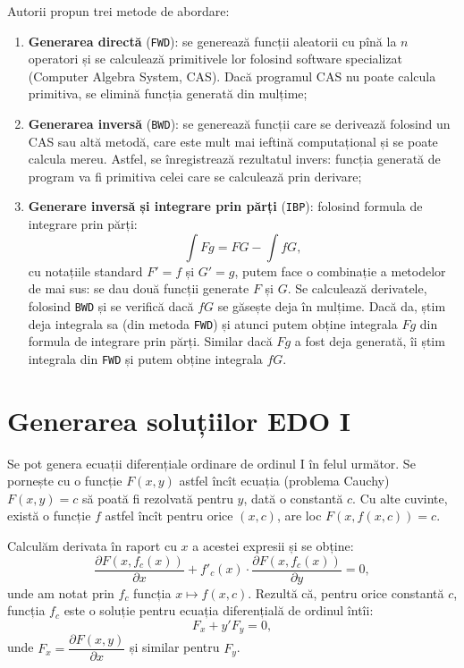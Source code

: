 Autorii propun trei metode de abordare:
\begin{enumerate}[(1)]
    \item \textbf{Generarea directă} (\texttt{FWD}): se generează funcții
        aleatorii cu pînă la $ n $ operatori și se calculează primitivele
        lor folosind software specializat (Computer Algebra System, CAS).
        Dacă programul CAS nu poate calcula primitiva, se elimină funcția
        generată din mulțime;
    \item \textbf{Generarea inversă} (\texttt{BWD}): se generează
        funcții care se derivează folosind un CAS sau altă metodă, care
        este mult mai ieftină computațional și se poate calcula mereu.
        Astfel, se înregistrează rezultatul invers: funcția generată
        de program va fi primitiva celei care se calculează prin derivare;
    \item \textbf{Generare inversă și integrare prin părți} (\texttt{IBP}):
        folosind formula de integrare prin părți:
        \[
              \int Fg = FG - \int fG,
        \]
        cu notațiile standard $ F' = f $ și $ G' = g $, putem face o combinație
        a metodelor de mai sus: se dau două funcții generate $ F $ și $ G $.
        Se calculează derivatele, folosind \texttt{BWD} și se verifică dacă
        $ fG $ se găsește deja în mulțime. Dacă da, știm deja integrala sa
        (din metoda \texttt{FWD}) și atunci putem obține integrala $ Fg $ din
        formula de integrare prin părți. Similar dacă $ Fg $ a fost deja
        generată, îi știm integrala din \texttt{FWD} și putem obține integrala $ fG $.
\end{enumerate}

\section{Generarea soluțiilor EDO I}

Se pot genera ecuații diferențiale ordinare de ordinul I în felul următor.
Se pornește cu o funcție $ F(x, y) $ astfel încît ecuația (problema Cauchy) 
$ F(x, y) = c $ să poată fi rezolvată pentru $ y $, dată o constantă $ c $.
Cu alte cuvinte, există o funcție $ f $ astfel încît pentru orice $ (x, c)$,
are loc $ F(x, f(x, c)) = c $.

Calculăm derivata în raport cu $ x $ a acestei expresii și se obține:
\[
    \frac{\partial F(x, f_c(x))}{\partial x} + f'_c(x) \cdot %
    \frac{\partial F(x, f_c(x))}{\partial y} = 0,
\]
unde am notat prin $ f_c $ funcția $ x \mapsto f(x, c) $. Rezultă că,
pentru orice constantă $ c $, funcția $ f_c $ este o soluție pentru
ecuația diferențială de ordinul întîi:
\[
      F_x + y' F_y = 0,
\]
unde $ F_x = \dfrac{\partial F(x, y)}{\partial x} $ și similar pentru $ F_y $.

